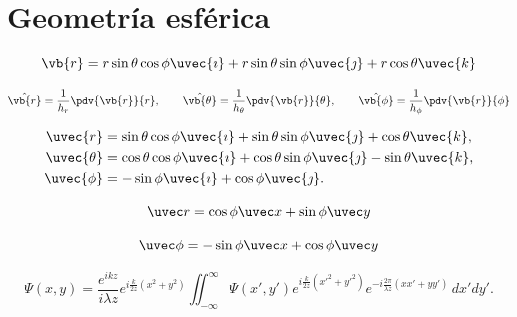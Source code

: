 \chapter{Geometría esférica}

\begin{equation*}
\vb{r} = r \sin\theta \cos\phi \uvec{\imath}
       + r \sin\theta \sin\phi \uvec{\jmath}
       + r \cos\theta \uvec{k}
\end{equation*}

\begin{equation*}
\hat{\vb{r}} = \frac{1}{h_r}\pdv{\vb{r}}{r}, \qquad
\hat{\vb{\theta}} = \frac{1}{h_\theta}\pdv{\vb{r}}{\theta}, \qquad
\hat{\vb{\phi}} = \frac{1}{h_\phi}\pdv{\vb{r}}{\phi}
\end{equation*}

\begin{align*}
\uvec{r} &= \sin\theta \cos\phi \uvec{\imath}
         + \sin\theta \sin\phi \uvec{\jmath}
         + \cos\theta \uvec{k}, \\
\uvec{\theta} &= \cos\theta \cos\phi \uvec{\imath}
              + \cos\theta \sin\phi \uvec{\jmath}
              - \sin\theta \uvec{k}, \\
\uvec{\phi} &= -\sin\phi \uvec{\imath}
             + \cos\phi \uvec{\jmath}.
\end{align*}

\begin{equation}
    \uvec r = \cos\phi \uvec x  + \sin\phi \uvec y 
    \label{eq:unit_r_def}
\end{equation}

\begin{equation}
    \uvec \phi = -\sin\phi \uvec x + \cos\phi \uvec y 
    \label{eq:unit_phi_def}
\end{equation}

\begin{equation}
    \Psi(x,y) = \frac{e^{ikz}}{i\lambda z} 
e^{i\frac{k}{2z}(x^2+y^2)} 
\iint_{-\infty}^{\infty} 
\Psi(x',y') e^{i\frac{k}{2z}(x'^2+y'^2)} 
e^{-i\frac{2\pi}{\lambda z}(xx' + yy')} 
\, dx' dy' .
    \label{eq:}
\end{equation}
